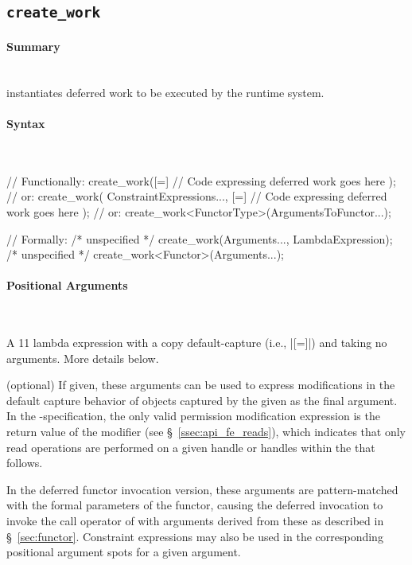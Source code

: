 \subsection{\texttt{create\_work}}
\label{ssec:api_fe_cw}

\paragraph{Summary}\mbox{}\\
 instantiates \gls{deferred work} to be executed by the \gls{runtime
system}.

\paragraph{Syntax}\mbox{}\\
\begin{CppCode}
// Functionally:
create_work([=]{
  // Code expressing deferred work goes here
});
// or:
create_work(
  ConstraintExpressions..., 
  [=]{
    // Code expressing deferred work goes here
  }
);
// or:
create_work<FunctorType>(ArgumentsToFunctor...);

// Formally:
/* unspecified */ create_work(Arguments..., LambdaExpression);
/* unspecified */ create_work<Functor>(Arguments...);
\end{CppCode}


\paragraph{Positional Arguments}\mbox{}\\
\begin{compactitem}
\item {} A \CC{}11 \gls{lambda} expression with a copy
    default-\gls{capture} (i.e., |[=]|) and taking no arguments.  More details
  below.
\item {} (optional) If given, these
  arguments can be used to express modifications in the default \gls{capture} behavior
  of  objects captured by the 
  given as the final argument.  In the \specVersion-specification, the only valid permission
  modification expression is the return value of the  modifier
  (see \S~\ref{ssec:api_fe_reads}), which indicates that only read operations
  are performed on a given \gls{handle} or \glspl{handle} within the
   that follows.
\item {} In the deferred functor invocation
  version, these arguments are pattern-matched with the formal parameters of the
  functor, causing the deferred invocation to invoke the call operator of
   with arguments derived from these as described in
  \S~\ref{sec:functor}.  Constraint expressions may also be used in the
  corresponding positional argument spots for a given \ahandleT argument.
\end{compactitem}


